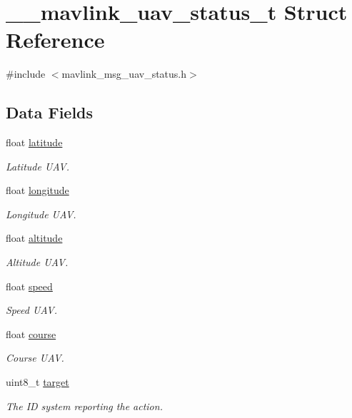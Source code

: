 \hypertarget{struct____mavlink__uav__status__t}{\section{\+\_\+\+\_\+mavlink\+\_\+uav\+\_\+status\+\_\+t Struct Reference}
\label{struct____mavlink__uav__status__t}
}


{\ttfamily \#include $<$mavlink\+\_\+msg\+\_\+uav\+\_\+status.\+h$>$}

\subsection*{Data Fields}
\begin{DoxyCompactItemize}
\item 
float \hyperlink{struct____mavlink__uav__status__t_ad4ddce7157d75cf73751428fc1209955}{latitude}
\begin{DoxyCompactList}\small\item\em Latitude U\+A\+V. \end{DoxyCompactList}\item 
float \hyperlink{struct____mavlink__uav__status__t_a3081ef5a1282398b18ba873255c0b65a}{longitude}
\begin{DoxyCompactList}\small\item\em Longitude U\+A\+V. \end{DoxyCompactList}\item 
float \hyperlink{struct____mavlink__uav__status__t_a7b8803502cad004dfef1243e40f5b425}{altitude}
\begin{DoxyCompactList}\small\item\em Altitude U\+A\+V. \end{DoxyCompactList}\item 
float \hyperlink{struct____mavlink__uav__status__t_a0681bd3a2d027d681a2f903458af004a}{speed}
\begin{DoxyCompactList}\small\item\em Speed U\+A\+V. \end{DoxyCompactList}\item 
float \hyperlink{struct____mavlink__uav__status__t_a2ce49c6bc127e6191ed1972e78cf89b3}{course}
\begin{DoxyCompactList}\small\item\em Course U\+A\+V. \end{DoxyCompactList}\item 
uint8\+\_\+t \hyperlink{struct____mavlink__uav__status__t_a7202983a31239d9f6ef60fa66674721e}{target}
\begin{DoxyCompactList}\small\item\em The I\+D system reporting the action. \end{DoxyCompactList}\end{DoxyCompactItemize}


